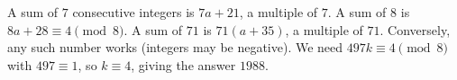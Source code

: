 A sum of $7$ consecutive integers is $7a+21$, a multiple of $7$. A sum of $8$ is $8a+28\equiv4\pmod8$. A sum of $71$ is $71(a+35)$, a multiple of $71$. Conversely, any such number works (integers may be negative). We need $497k\equiv4\pmod8$ with $497\equiv1$, so $k\equiv4$, giving the answer $\boxed{1988}$.
